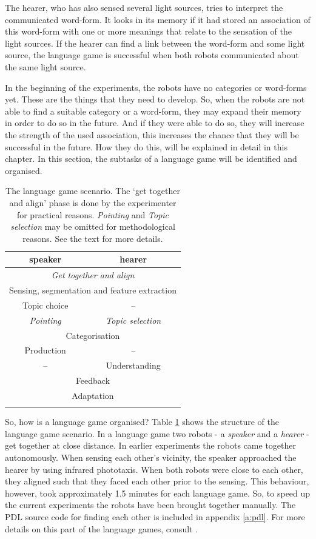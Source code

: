 The hearer, who has also sensed several light sources, tries to interpret the communicated word-form. It looks in its memory if it had stored an association of this word-form with one or more meanings that relate to the sensation of the light sources. If the hearer can find a link between the word-form and some light source, the language game is successful when both robots communicated about the same light source.

In the beginning of the experiments, the robots have no categories or word-forms yet. These are the things that they need to develop. So, when the robots are not able to find a suitable category or a word-form, they may expand their memory in order to do so in the future. And if they were able to do so, they will increase the strength of the used association, this increases the chance that they will be successful in the future. How they do this, will be explained in detail in this chapter. In this section, the subtasks of a language game will be identified and organised.

\begin{table}
\centering
\begin{tabular}{cc}
\lsptoprule
{\sc speaker} & {\sc hearer}\\
\midrule
\multicolumn{2}{c}{{\em Get together and align}}\\\midrule
\multicolumn{2}{c}{Sensing, segmentation and feature extraction}\\\midrule
Topic choice & --\\\midrule
{\em Pointing} & {\em Topic selection}\\\midrule
\multicolumn{2}{c}{Categorisation}\\\midrule
Production & --\\\midrule
-- & Understanding\\\midrule
\multicolumn{2}{c}{Feedback}\\\midrule
\multicolumn{2}{c}{Adaptation}\\\lspbottomrule
\end{tabular}
\caption{The language game scenario. The `get together and align' phase is done by the experimenter for practical reasons. {\em Pointing} and {\em Topic selection} may be omitted for methodological reasons. See the text for more details.}
\label{t:scenario1}
\end{table}


So, how is a language game organised? Table \ref{t:scenario1} shows the structure of the language game scenario. In a language game two robots - a {\em speaker} and a {\em hearer} - get together at close distance. In earlier experiments \citep{steelsvogt:1997} the robots came together autonomously. When sensing each other's vicinity, the speaker approached the hearer by using infrared phototaxis. When both robots were close to each other, they aligned such that they faced each other prior to the sensing. This behaviour, however, took approximately 1.5 minutes for each language game. So, to speed up the current experiments the robots have been brought together manually. The PDL source code for finding each other is included in appendix \ref{a:pdl}. For more details on this part of the language games, consult \citep{vogt:1997}.  

